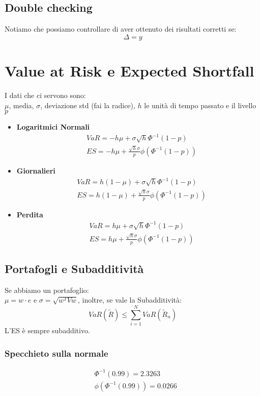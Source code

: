 \documentclass[a4paper,notitlepage]{report}%
\begin{document}
\begin{multicols*}{2}
    \subsection*{Double checking}
    Notiamo che possiamo controllare di aver ottenuto dei risultati
    corretti se:
    \[
        \Delta = y
    \]

\section*{Value at Risk e Expected Shortfall}
    I dati che ci servono sono: \\
    $\mu$, media, $\sigma$, deviazione std (fai la radice),
    $h$ le unità di tempo passato e il livello $p$
    \begin{itemize}
        \item \textbf{Logaritmici Normali} 
            \begin{align*}
                &VaR = -h\mu+\sigma\sqrt{h}\Phi^{-1}(1-p) \\
                &ES = -h\mu+\frac{\sqrt{h}\sigma}{p} \phi(\Phi^{-1}(1-p))
            \end{align*}
        \item \textbf{Giornalieri}
            \begin{align*}
                &VaR = h(1-\mu)+\sigma\sqrt{h}\Phi^{-1}(1-p) \\
                &ES = h(1-\mu)+\frac{\sqrt{h}\sigma}{p} \phi(\Phi^{-1}(1-p))
            \end{align*}
        \item \textbf{Perdita}
            \begin{align*}
                &VaR = h\mu+\sigma\sqrt{h}\Phi^{-1}(1-p) \\
                &ES = h\mu+\frac{\sqrt{h}\sigma}{p} \phi(\Phi^{-1}(1-p))
            \end{align*}
    \end{itemize}

    \subsection*{Portafogli e Subadditività}
    Se abbiamo un portafoglio:\\
    $\mu = w\cdot e$ e $\sigma = \sqrt{w^TVw}$, inoltre, se vale
    la Subadditività:
    \[
        VaR(\tilde{R}) \leq \sum_{i=1}^N VaR(\tilde{R}_n)  
    \]
    L'ES è sempre subadditivo.

    \subsubsection*{Specchieto sulla normale}
    \begin{align*}
        & \Phi^{-1}(0.99) = 2.3263\\
        & \phi(\Phi^{-1}(0.99)) = 0.0266
    \end{align*}

    
\end{multicols*}
\end{document}
